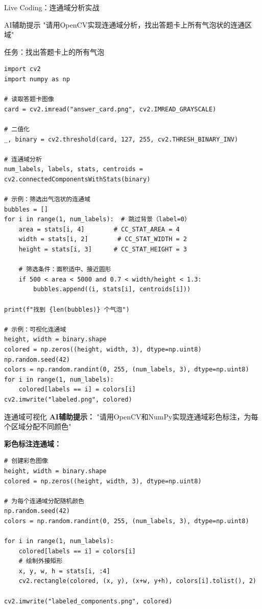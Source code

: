 \begin{frame}[fragile]{Live Coding：连通域分析实战}
    \begin{block}{AI辅助提示}
        \aihint{} "请用OpenCV实现连通域分析，找出答题卡上所有气泡状的连通区域"
    \end{block}

    \begin{block}{任务：找出答题卡上的所有气泡}
    \begin{lstlisting}[basicstyle=\ttfamily\scriptsize]
import cv2
import numpy as np

# 读取答题卡图像
card = cv2.imread("answer_card.png", cv2.IMREAD_GRAYSCALE)

# 二值化
_, binary = cv2.threshold(card, 127, 255, cv2.THRESH_BINARY_INV)

# 连通域分析
num_labels, labels, stats, centroids = cv2.connectedComponentsWithStats(binary)

# 示例：筛选出气泡状的连通域
bubbles = []
for i in range(1, num_labels):  # 跳过背景（label=0）
    area = stats[i, 4]        # CC_STAT_AREA = 4
    width = stats[i, 2]        # CC_STAT_WIDTH = 2
    height = stats[i, 3]      # CC_STAT_HEIGHT = 3

    # 筛选条件：面积适中、接近圆形
    if 500 < area < 5000 and 0.7 < width/height < 1.3:
        bubbles.append((i, stats[i], centroids[i]))

print(f"找到 {len(bubbles)} 个气泡")

# 示例：可视化连通域
height, width = binary.shape
colored = np.zeros((height, width, 3), dtype=np.uint8)
np.random.seed(42)
colors = np.random.randint(0, 255, (num_labels, 3), dtype=np.uint8)
for i in range(1, num_labels):
    colored[labels == i] = colors[i]
cv2.imwrite("labeled.png", colored)
    \end{lstlisting}
    \end{block}
\end{frame}

\begin{frame}[fragile]{连通域可视化}
    \textbf{AI辅助提示：}
    \aihint{} "请用OpenCV和NumPy实现连通域彩色标注，为每个区域分配不同颜色"

    \textbf{彩色标注连通域：}
    \begin{lstlisting}
# 创建彩色图像
height, width = binary.shape
colored = np.zeros((height, width, 3), dtype=np.uint8)

# 为每个连通域分配随机颜色
np.random.seed(42)
colors = np.random.randint(0, 255, (num_labels, 3), dtype=np.uint8)

for i in range(1, num_labels):
    colored[labels == i] = colors[i]
    # 绘制外接矩形
    x, y, w, h = stats[i, :4]
    cv2.rectangle(colored, (x, y), (x+w, y+h), colors[i].tolist(), 2)

cv2.imwrite("labeled_components.png", colored)
    \end{lstlisting}
\end{frame}


